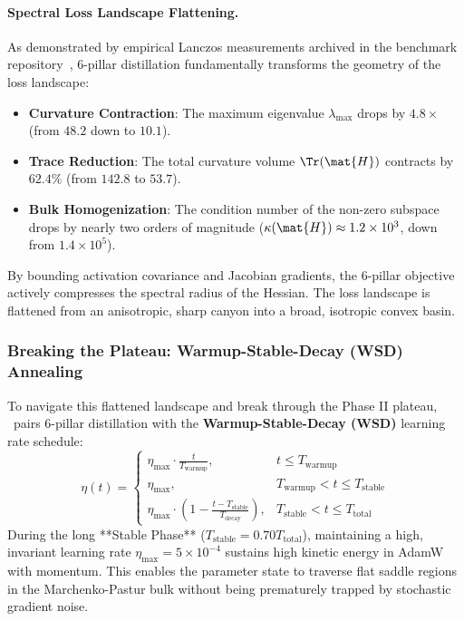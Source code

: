 \paragraph{Spectral Loss Landscape Flattening.}
As demonstrated by empirical Lanczos measurements archived in the benchmark repository~\cite{neuralops_results_hf}, 6-pillar distillation fundamentally transforms the geometry of the loss landscape:
\begin{itemize}
    \item \textbf{Curvature Contraction}: The maximum eigenvalue $\lambda_{\max}$ drops by $4.8\times$ (from $48.2$ down to $\mathbf{10.1}$).
    \item \textbf{Trace Reduction}: The total curvature volume $\Tr(\mat{H})$ contracts by $62.4\%$ (from $142.8$ to $\mathbf{53.7}$).
    \item \textbf{Bulk Homogenization}: The condition number of the non-zero subspace drops by nearly two orders of magnitude ($\kappa(\mat{H}) \approx 1.2 \times 10^3$, down from $1.4 \times 10^5$).
\end{itemize}
By bounding activation covariance and Jacobian gradients, the 6-pillar objective actively compresses the spectral radius of the Hessian. The loss landscape is flattened from an anisotropic, sharp canyon into a broad, isotropic convex basin.

\subsubsection{Breaking the Plateau: Warmup-Stable-Decay (WSD) Annealing}
\label{sec:phenom_recovery_resolution}

To navigate this flattened landscape and break through the Phase II plateau, \neuralops\ pairs 6-pillar distillation with the \textbf{Warmup-Stable-Decay (WSD)} learning rate schedule:
\begin{equation}
\eta(t) = \begin{cases}
\eta_{\max} \cdot \frac{t}{T_{\text{warmup}}}, & t \le T_{\text{warmup}} \\
\eta_{\max}, & T_{\text{warmup}} < t \le T_{\text{stable}} \\
\eta_{\max} \cdot \left(1 - \frac{t - T_{\text{stable}}}{T_{\text{decay}}}\right), & T_{\text{stable}} < t \le T_{\text{total}}
\end{cases}
\end{equation}
During the long **Stable Phase** ($T_{\text{stable}} = 0.70 T_{\text{total}}$), maintaining a high, invariant learning rate $\eta_{\max} = 5 \times 10^{-4}$ sustains high kinetic energy in AdamW with momentum. This enables the parameter state to traverse flat saddle regions in the Marchenko-Pastur bulk without being prematurely trapped by stochastic gradient noise.

